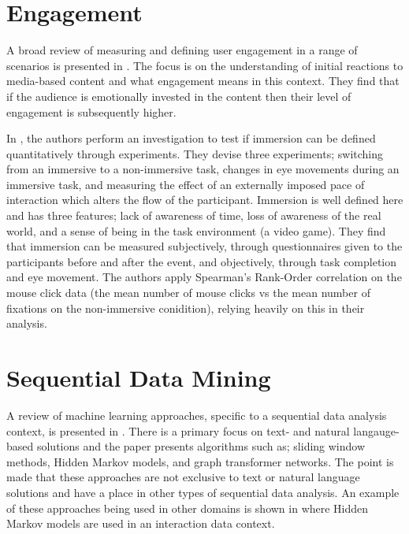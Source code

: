 \documentclass{llncs2e/llncs}
\begin{document}
  \section{Engagement}
  A broad review of measuring and defining user engagement in a range of scenarios
  is presented in \cite{brown_glancy}. The focus is on the understanding of initial
  reactions to media-based content and what engagement means in this context. They
  find that if the audience is emotionally invested in the content then their
  level of engagement is subsequently higher.

  In \cite{jennett2008measuring}, the authors perform an investigation to test
  if immersion can be defined quantitatively through experiments. They devise
  three experiments; switching from an immersive to a non-immersive task, changes
  in eye movements during an immersive task, and measuring the effect of an externally
  imposed pace of interaction which alters the flow of the participant. Immersion
  is well defined here and has three features; lack of awareness of time, loss of
  awareness of the real world, and a sense of being in the task environment (a video
  game). They find that immersion can be measured subjectively, through questionnaires
  given to the participants before and after the event, and objectively, through
  task completion and eye movement. The authors apply Spearman's Rank-Order correlation
  on the mouse click data (the mean number of mouse clicks vs the mean number of
  fixations on the non-immersive conidition), relying heavily on this in their
  analysis.

  \section{Sequential Data Mining}
  A review of machine learning approaches, specific to a sequential data analysis
  context, is presented in \cite{dietterich2002machine}. There is a primary focus
  on text- and natural langauge-based solutions and the paper presents algorithms
  such as; sliding window methods, Hidden Markov models, and graph transformer networks.
  The point is made that these approaches are not exclusive to text or natural language
  solutions and have a place in other types of sequential data analysis. An example of these
  approaches being used in other domains is shown in \cite{kodagoda2017using} where
  Hidden Markov models are used in an interaction data context.
\end{document}
